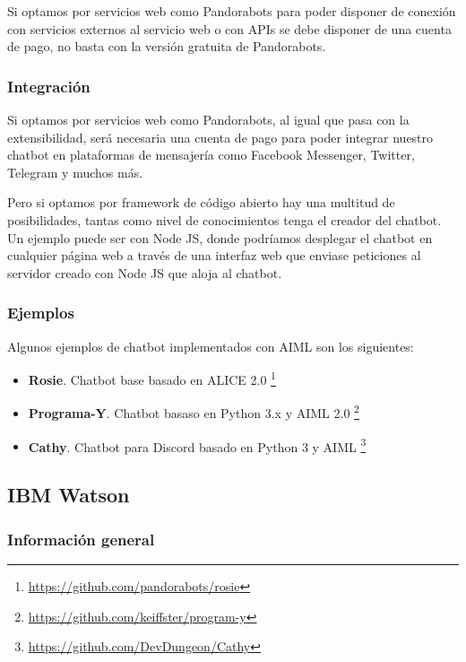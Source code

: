 Si optamos por servicios web como Pandorabots para poder disponer de conexión con servicios externos al servicio web o con APIs se debe disponer de una cuenta de pago, no basta con la versión gratuita de Pandorabots.

\subsubsection*{Integración}

Si optamos por servicios web como Pandorabots, al igual que pasa con la extensibilidad, será necesaria una cuenta de pago para poder integrar nuestro chatbot en plataformas de mensajería como Facebook Messenger, Twitter, Telegram y muchos más.

Pero si optamos por framework de código abierto hay una multitud de posibilidades, tantas como nivel de conocimientos tenga el creador del chatbot. Un ejemplo puede ser con Node JS, donde podríamos desplegar el chatbot en cualquier página web a través de una interfaz web que enviase peticiones al servidor creado con Node JS que aloja al chatbot.

\subsubsection*{Ejemplos}

Algunos ejemplos de chatbot implementados con AIML son los siguientes:

\begin{itemize}
    \item \textbf{Rosie}. Chatbot base basado en ALICE 2.0 \footnote{\url{https://github.com/pandorabots/rosie}}
    \item \textbf{Programa-Y}. Chatbot basaso en Python 3.x y AIML 2.0 \footnote{\url{https://github.com/keiffster/program-y}}
    \item \textbf{Cathy}. Chatbot para Discord basado en Python 3 y AIML \footnote{\url{https://github.com/DevDungeon/Cathy}}
\end{itemize}


\subsection{IBM Watson}

\subsubsection*{Información general}

